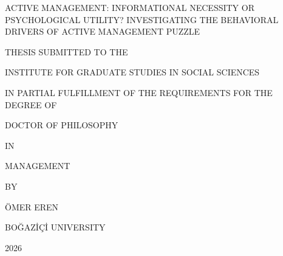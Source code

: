 \documentclass[12pt, oneside]{report}
\begin{document}

\begin{titlepage}
\thispagestyle{empty}
\begin{center}

\vspace*{1.2in}

ACTIVE MANAGEMENT: INFORMATIONAL NECESSITY OR PSYCHOLOGICAL UTILITY?
INVESTIGATING THE BEHAVIORAL DRIVERS OF ACTIVE MANAGEMENT PUZZLE

\vspace{0.5in}

THESIS SUBMITTED TO THE

INSTITUTE FOR GRADUATE STUDIES IN SOCIAL SCIENCES

IN PARTIAL FULFILLMENT OF THE REQUIREMENTS FOR THE DEGREE OF

\vspace{0.5in}

DOCTOR OF PHILOSOPHY

IN

MANAGEMENT

\vspace{0.5in}

BY

ÖMER EREN

\vspace{0.5in}

BOĞAZİÇİ UNIVERSITY

2026

\end{center}
\end{titlepage}

\setcounter{page}{1}
\end{document}
